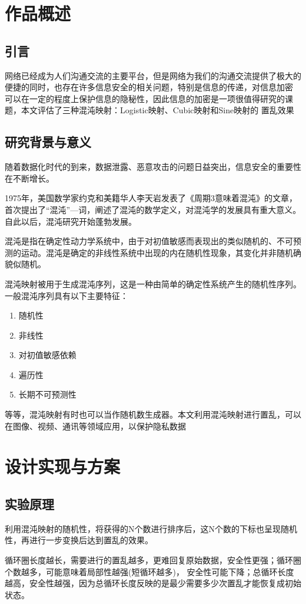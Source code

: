 \documentclass[a4paper]{article}
\begin{document}
\clearpage
\tableofcontents
\clearpage
\section{作品概述}
\subsection{引言}
网络已经成为人们沟通交流的主要平台，但是网络为我们的沟通交流提供了极大的便捷的同时，也存在许多信息安全的相关问题，特别是信息的传递，对信息加密
可以在一定的程度上保护信息的隐秘性，因此信息的加密是一项很值得研究的课题，本文评估了三种混沌映射：Logistic映射、Cubic映射和Sine映射的
置乱效果\par

\subsection{研究背景与意义}
随着数据化时代的到来，数据泄露、恶意攻击的问题日益突出，信息安全的重要性在不断增长。\par
1975年，美国数学家约克和美籍华人李天岩发表了《周期3意味着混沌》的文章，首次提出了“混沌”—词，阐述了混沌的数学定义，对混沌学的发展具有重大意义。自此以后，混沌研究开始蓬勃发展。\par
混沌是指在确定性动力学系统中，由于对初值敏感而表现出的类似随机的、不可预测的运动。混沌是确定的非线性系统中出现的内在随机性现象，其变化并非随机确貌似随机。\cite{ref1}\par
混沌映射被用于生成混沌序列，这是一种由简单的确定性系统产生的随机性序列。一般混沌序列具有以下主要特征：
\begin{enumerate}
  \item 随机性
  \item 非线性
  \item 对初值敏感依赖
  \item 遍历性
  \item 长期不可预测性
\end{enumerate}
等等，混沌映射有时也可以当作随机数生成器。本文利用混沌映射进行置乱，可以在图像、视频、通讯等领域应用，以保护隐私数据

\clearpage
\section{设计实现与方案}

\subsection{实验原理}
利用混沌映射的随机性，将获得的N个数进行排序后，这N个数的下标也呈现随机性，再进行一步变换后达到置乱的效果。\par
循环圈长度越长，需要进行的置乱越多，更难回复原始数据，安全性更强；循环圈个数越多，可能意味着局部性越强(短循环越多)，
安全性可能下降；总循环长度越高，安全性越强，因为总循环长度反映的是最少需要多少次置乱才能恢复成初始状态。
\end{document}
